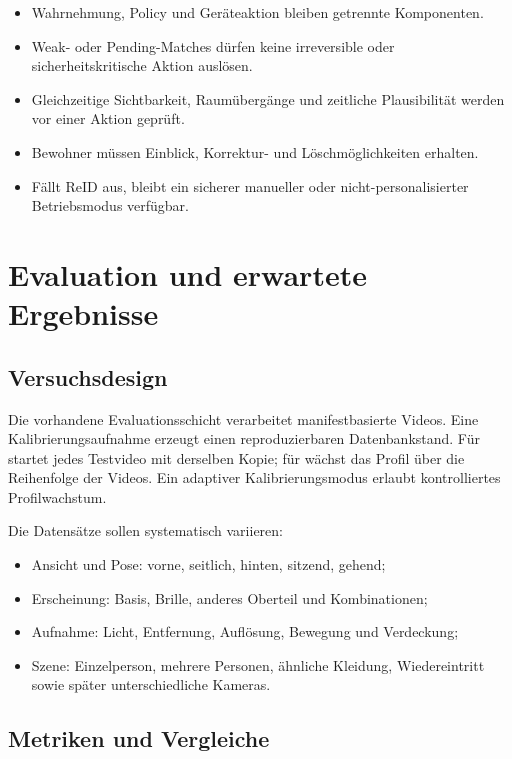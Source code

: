 \begin{itemize}[leftmargin=7mm]
  \item Wahrnehmung, Policy und Geräteaktion bleiben getrennte Komponenten.
  \item Weak- oder Pending-Matches dürfen keine irreversible oder
    sicherheitskritische Aktion auslösen.
  \item Gleichzeitige Sichtbarkeit, Raumübergänge und zeitliche Plausibilität
    werden vor einer Aktion geprüft.
  \item Bewohner müssen Einblick, Korrektur- und Löschmöglichkeiten erhalten.
  \item Fällt ReID aus, bleibt ein sicherer manueller oder nicht-personalisierter
    Betriebsmodus verfügbar.
\end{itemize}


\section{Evaluation und erwartete Ergebnisse}

\subsection{Versuchsdesign}

Die vorhandene Evaluationsschicht verarbeitet manifestbasierte Videos. Eine
Kalibrierungsaufnahme erzeugt einen reproduzierbaren Datenbankstand. Für
 startet jedes Testvideo mit derselben Kopie; für
 wächst das Profil über die Reihenfolge der Videos. Ein
adaptiver Kalibrierungsmodus erlaubt kontrolliertes Profilwachstum.

Die Datensätze sollen systematisch variieren:

\begin{itemize}[leftmargin=7mm]
  \item Ansicht und Pose: vorne, seitlich, hinten, sitzend, gehend;
  \item Erscheinung: Basis, Brille, anderes Oberteil und Kombinationen;
  \item Aufnahme: Licht, Entfernung, Auflösung, Bewegung und Verdeckung;
  \item Szene: Einzelperson, mehrere Personen, ähnliche Kleidung,
    Wiedereintritt sowie später unterschiedliche Kameras.
\end{itemize}

\subsection{Metriken und Vergleiche}

